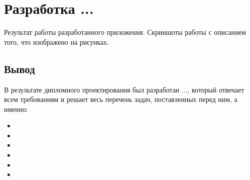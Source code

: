 \section{Разработка ...}
\label{sec:development}

Результат работы разработанного приложения. Скриншоты работы с описанием того, что изображено на рисунках.


\subsection{Вывод}
В результате дипломного проектирования был разработан ..., который отвечает всем требованиям и решает весь перечень задач, поставленных перед ним, а именно:

\begin{itemize}
    \item
    \item
    \item
    \item
    \item
    \item
\end{itemize}